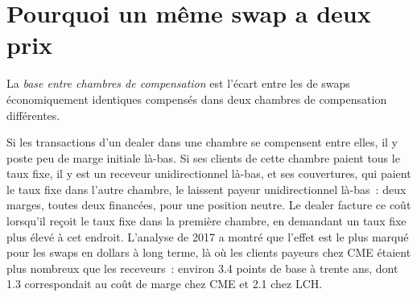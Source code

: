 \begin{omfigure}

\label{fig:m2:swap-clearing-and-the-ccp-basis:im}
\end{omfigure}

\section{Pourquoi un même swap a deux prix}

\begin{definition}\label{def:m2:swap-clearing-and-the-ccp-basis:basis}
La \emph{base entre chambres de compensation} est l'écart entre les 
de swaps économiquement identiques compensés dans deux chambres de compensation différentes.
\end{definition}

Si les transactions d'un dealer dans une chambre se compensent entre elles, il y poste peu
de marge initiale là-bas. Si ses clients de cette chambre paient tous le taux fixe, il y est un receveur unidirectionnel
là-bas, et ses couvertures, qui paient le taux fixe dans l'autre chambre, le laissent
payeur unidirectionnel là-bas~: deux marges, toutes deux financées, pour une position neutre. Le dealer
facture ce coût lorsqu'il reçoit le taux fixe dans la première chambre, en demandant
un taux fixe plus élevé à cet endroit. L'analyse de 2017 a montré que l'effet est le plus marqué pour les
swaps en dollars à long terme, là où les clients payeurs chez CME étaient plus nombreux que les receveurs~: environ 3.4 points de base
à trente ans, dont 1.3 correspondait au coût de marge chez CME et 2.1 chez LCH.

